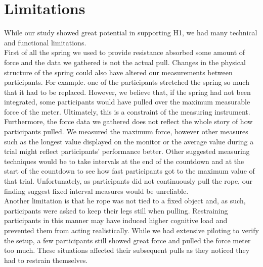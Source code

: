 \section{Limitations}
\label{section:limitations}
While our study showed great potential in supporting H1, we had many technical and functional limitations.\\
First of all the spring we used to provide resistance absorbed some amount of force and the data we gathered is not the actual pull. Changes in the physical structure of the spring could  also have altered our measurements between participants. For example. one of the participants stretched the spring so much that it had to be replaced. However, we believe that, if the spring had not been integrated, some participants would have pulled over the maximum measurable force of the meter. Ultimately, this is a constraint of the measuring instrument. \\
Furthermore, the force data we gathered does not reflect the whole story of how participants pulled. We measured the maximum force, however other measures such as the longest value displayed on the monitor or the average value during a trial might reflect participants' performance better. Other suggested measuring techniques would be to take intervals at the end of the countdown and at the start of the countdown to see how fast participants got to the maximum value of that trial. Unfortunately, as participants did not continuously pull the rope, our finding suggest fixed interval measures would be unreliable. 
\\
Another limitation is that he rope was not tied to a fixed object and, as such, participants were asked to keep their legs still when pulling. Restraining participants in this manner may have induced higher cognitive load and prevented them from acting realistically. While we had extensive piloting to verify the setup, a few participants still showed great force and pulled the force meter too much. These situations affected their subsequent pulls as they noticed they had to restrain themselves.
